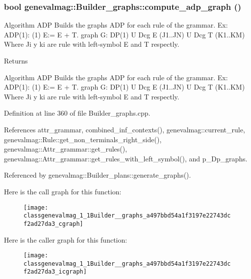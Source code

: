 \hypertarget{classgenevalmag_1_1Builder__graphs_a497bbd54a1f3197e22743dcf2ad27da3}{
\subsubsection[{compute\_\-adp\_\-graph}]{\setlength{\rightskip}{0pt plus 5cm}bool genevalmag::Builder\_\-graphs::compute\_\-adp\_\-graph ()}}
\label{classgenevalmag_1_1Builder__graphs_a497bbd54a1f3197e22743dcf2ad27da3}
Algorithm ADP Builds the graphs ADP for each rule of the grammar. Ex: ADP(1): (1) E:= E + T. graph G: DP(1) U Dcg E (J1..JN) U Dcg T (K1..KM) Where Ji y ki are rule with left-\/symbol E and T respectly. \begin{DoxyReturn}{Returns}

\end{DoxyReturn}
Algorithm ADP Builds the graphs ADP for each rule of the grammar. Ex: ADP(1): (1) E:= E + T. graph G: DP(1) U Dcg E (J1..JN) U Dcg T (K1..KM) Where Ji y ki are rule with left-\/symbol E and T respectly. 

Definition at line 360 of file Builder\_\-graphs.cpp.



References attr\_\-grammar, combined\_\-inf\_\-contexts(), genevalmag::current\_\-rule, genevalmag::Rule::get\_\-non\_\-terminals\_\-right\_\-side(), genevalmag::Attr\_\-grammar::get\_\-rules(), genevalmag::Attr\_\-grammar::get\_\-rules\_\-with\_\-left\_\-symbol(), and p\_\-Dp\_\-graphs.



Referenced by genevalmag::Builder\_\-plans::generate\_\-graphs().



Here is the call graph for this function:\nopagebreak
\begin{figure}[H]
\begin{center}
\leavevmode
\texttt{[image: classgenevalmag\_1\_1Builder\_\_graphs\_a497bbd54a1f3197e22743dcf2ad27da3\_cgraph]}
\end{center}
\end{figure}




Here is the caller graph for this function:\nopagebreak
\begin{figure}[H]
\begin{center}
\leavevmode
\texttt{[image: classgenevalmag\_1\_1Builder\_\_graphs\_a497bbd54a1f3197e22743dcf2ad27da3\_icgraph]}
\end{center}
\end{figure}



